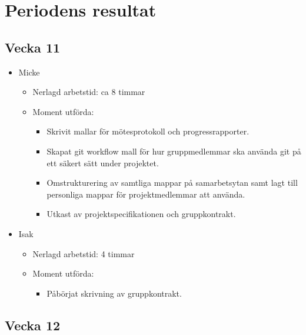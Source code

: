 \section{Periodens resultat}
\subsection*{Vecka 11}

\begin{itemize}[noitemsep]
    \item Micke
    \begin{itemize}[noitemsep]
        \item Nerlagd arbetstid: ca 8 timmar
        \item Moment utförda:
        \begin{itemize}[noitemsep]
            \item Skrivit mallar för mötesprotokoll och progressrapporter.
            \item Skapat git workflow mall för hur gruppmedlemmar ska använda git på ett säkert sätt under projektet.
            \item Omstrukturering av samtliga mappar på samarbetsytan samt lagt till personliga mappar för projektmedlemmar att använda.
            \item Utkast av projektspecifikationen och gruppkontrakt.
        \end{itemize}
    \end{itemize}
    \item Isak
    \begin{itemize}[noitemsep]
        \item Nerlagd arbetstid: 4 timmar
        \item Moment utförda:
        \begin{itemize}[noitemsep]
            \item Påbörjat skrivning av gruppkontrakt.
        \end{itemize}
    \end{itemize}
\end{itemize}

\subsection*{Vecka 12}

